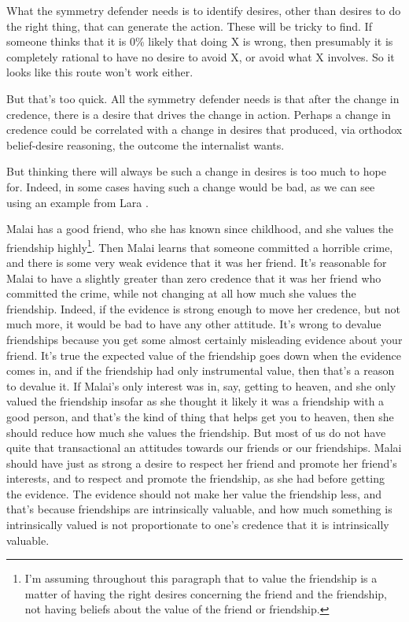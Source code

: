 What the symmetry defender needs is to identify desires, other than desires to do the right thing, that can generate the action. These will be tricky to find. If someone thinks that it is 0\% likely that doing X is wrong, then presumably it is completely rational to have no desire to avoid X, or avoid what X involves. So it looks like this route won't work either.

But that's too quick. All the symmetry defender needs is that after the change in credence, there is a desire that drives the change in action. Perhaps a change in credence could be correlated with a change in desires that produced, via orthodox belief-desire reasoning, the outcome the internalist wants.

But thinking there will always be such a change in desires is too much to hope for. Indeed, in some cases having such a change would be bad, as we can see using an example from Lara \citet{Buchak2013}.

\gls{Malai} has a good friend, who she has known since childhood, and she values the friendship highly\footnote{I'm assuming throughout this paragraph that to value the friendship is a matter of having the right desires concerning the friend and the friendship, not having beliefs about the value of the friend or friendship.}. Then \gls{Malai} learns that someone committed a horrible crime, and there is some very weak evidence that it was her friend. It's reasonable for \gls{Malai} to have a slightly greater than zero credence that it was her friend who committed the crime, while not changing at all how much she values the friendship. Indeed, if the evidence is strong enough to move her credence, but not much more, it would be bad to have any other attitude. It's wrong to devalue friendships because you get some almost certainly misleading evidence about your friend. It's true the expected value of the friendship goes down when the evidence comes in, and if the friendship had only instrumental value, then that's a reason to devalue it. If \gls{Malai}'s only interest was in, say, getting to heaven, and she only valued the friendship insofar as she thought it likely it was a friendship with a good person, and that's the kind of thing that helps get you to heaven, then she should reduce how much she values the friendship. But most of us do not have quite that transactional an attitudes towards our friends or our friendships. \gls{Malai} should have just as strong a desire to respect her friend and promote her friend's interests, and to respect and promote the friendship, as she had before getting the evidence. The evidence should not make her value the friendship less, and that's because friendships are intrinsically valuable, and how much something is intrinsically valued is not proportionate to one's credence that it is intrinsically valuable.

